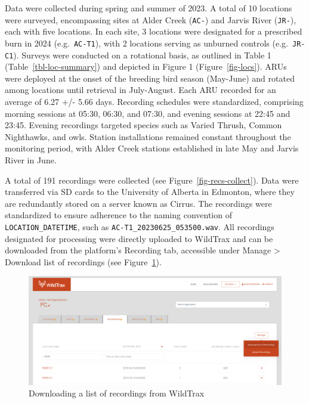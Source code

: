 \documentclass[
  letterpaper,
  DIV=11,
  numbers=noendperiod,
  oneside]{scrartcl}
\begin{document}
Data were collected during spring and summer of 2023. A total of 10
locations were surveyed, encompassing sites at Alder Creek
(\texttt{AC-}) and Jarvis River (\texttt{JR-}), each with five
locations. In each site, 3 locations were designated for a prescribed
burn in 2024 (e.g.~\texttt{AC-T1}), with 2 locations serving as unburned
controls (e.g.~\texttt{JR-C1}). Surveys were conducted on a rotational
basis, as outlined in Table 1 (Table~\ref{tbl-loc-summary}) and depicted
in Figure 1 (Figure~\ref{fig-locs}). ARUs were deployed at the onset of
the breeding bird season (May-June) and rotated among locations until
retrieval in July-August. Each ARU recorded for an average of 6.27 +/-
5.66 days. Recording schedules were standardized, comprising morning
sessions at 05:30, 06:30, and 07:30, and evening sessions at 22:45 and
23:45. Evening recordings targeted species such as Varied Thrush, Common
Nighthawks, and owls. Station installations remained constant throughout
the monitoring period, with Alder Creek stations established in late May
and Jarvis River in June.

A total of 191 recordings were collected (see
Figure~\ref{fig-recs-collect}). Data were transferred via SD cards to
the University of Alberta in Edmonton, where they are redundantly stored
on a server known as Cirrus. The recordings were standardized to ensure
adherence to the naming convention of \texttt{LOCATION\_DATETIME}, such
as \texttt{AC-T1\_20230625\_053500.wav}. All recordings designated for
processing were directly uploaded to WildTrax and can be downloaded from
the platform's Recording tab, accessible under Manage \textgreater{}
Download list of recordings (see Figure~\ref{fig-download-recs}).

\begin{figure}

{\centering \includegraphics{download-recs.png}

}

\caption{\label{fig-download-recs}Downloading a list of recordings from
WildTrax}

\end{figure}
\end{document}
